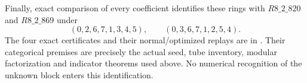 Finally, exact comparison of every coefficient identifies these rings
with $R8\_2\_820$ and $R8\_2\_869$ under
\[
 (0,2,6,7,1,3,4,5),\qquad(0,3,6,7,1,2,5,4).
\]
The four exact certificates and their normal/optimized replays are in
. Their categorical premises are
precisely the actual seed, tube inventory, modular factorization and
indicator theorems used above. No numerical recognition of the unknown
block enters this identification.

